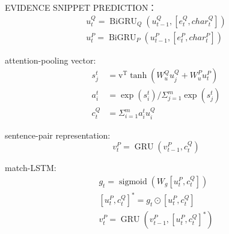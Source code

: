 \documentclass[a4paper,UTF8]{article}
\numberwithin{equation}{section}
\begin{document}
EVIDENCE SNIPPET PREDICTION：\\
\begin{equation}
\begin{array}{l}{u_{t}^{Q}=\operatorname{BiGRU}_{Q}\left(u_{t-1}^{Q},\left[e_{t}^{Q}, c h a r_{t}^{Q}\right]\right)} \\ {u_{t}^{P}=\operatorname{BiGRU}_{P}\left(u_{t-1}^{P},\left[e_{t}^{P}, c h a r_{t}^{P}\right]\right)}\end{array}
\end{equation}

attention-pooling vector:
\begin{equation}
\begin{aligned} s_{j}^{t} &=\mathrm{v}^{\mathrm{T}} \tanh \left(W_{u}^{Q} u_{j}^{Q}+W_{u}^{P} u_{t}^{P}\right) \\ a_{i}^{t} &=\exp \left(s_{i}^{t}\right) / \Sigma_{j=1}^{m} \exp \left(s_{j}^{t}\right) \\ c_{t}^{Q} &=\Sigma_{i=1}^{m} a_{i}^{t} u_{i}^{Q} \end{aligned}
\end{equation}

sentence-pair representation:
\begin{equation}
	v_{t}^{P}=\operatorname{GRU}\left(v_{t-1}^{P}, c_{t}^{Q}\right)
	\end{equation}

match-LSTM:
\begin{equation}
\begin{array}{l}{g_{t}=\operatorname{sigmoid}\left(W_{g}\left[u_{t}^{P}, c_{t}^{Q}\right]\right)} \\ {\left[u_{t}^{P}, c_{t}^{Q}\right]^{*}=g_{t} \odot\left[u_{t}^{P}, c_{t}^{Q}\right]} \\ {v_{t}^{P}=\operatorname{GRU}\left(v_{t-1}^{P},\left[u_{t}^{P}, c_{t}^{Q}\right]^{*}\right)}\end{array}
\end{equation}
\end{document}
